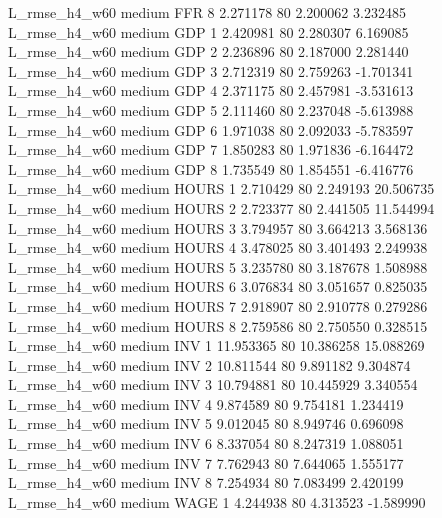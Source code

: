  L_rmse_h4_w60     medium      FFR                 8  2.271178 80       2.200062           3.232485
 L_rmse_h4_w60     medium      GDP                 1  2.420981 80       2.280307           6.169085
 L_rmse_h4_w60     medium      GDP                 2  2.236896 80       2.187000           2.281440
 L_rmse_h4_w60     medium      GDP                 3  2.712319 80       2.759263          -1.701341
 L_rmse_h4_w60     medium      GDP                 4  2.371175 80       2.457981          -3.531613
 L_rmse_h4_w60     medium      GDP                 5  2.111460 80       2.237048          -5.613988
 L_rmse_h4_w60     medium      GDP                 6  1.971038 80       2.092033          -5.783597
 L_rmse_h4_w60     medium      GDP                 7  1.850283 80       1.971836          -6.164472
 L_rmse_h4_w60     medium      GDP                 8  1.735549 80       1.854551          -6.416776
 L_rmse_h4_w60     medium    HOURS                 1  2.710429 80       2.249193          20.506735
 L_rmse_h4_w60     medium    HOURS                 2  2.723377 80       2.441505          11.544994
 L_rmse_h4_w60     medium    HOURS                 3  3.794957 80       3.664213           3.568136
 L_rmse_h4_w60     medium    HOURS                 4  3.478025 80       3.401493           2.249938
 L_rmse_h4_w60     medium    HOURS                 5  3.235780 80       3.187678           1.508988
 L_rmse_h4_w60     medium    HOURS                 6  3.076834 80       3.051657           0.825035
 L_rmse_h4_w60     medium    HOURS                 7  2.918907 80       2.910778           0.279286
 L_rmse_h4_w60     medium    HOURS                 8  2.759586 80       2.750550           0.328515
 L_rmse_h4_w60     medium      INV                 1 11.953365 80      10.386258          15.088269
 L_rmse_h4_w60     medium      INV                 2 10.811544 80       9.891182           9.304874
 L_rmse_h4_w60     medium      INV                 3 10.794881 80      10.445929           3.340554
 L_rmse_h4_w60     medium      INV                 4  9.874589 80       9.754181           1.234419
 L_rmse_h4_w60     medium      INV                 5  9.012045 80       8.949746           0.696098
 L_rmse_h4_w60     medium      INV                 6  8.337054 80       8.247319           1.088051
 L_rmse_h4_w60     medium      INV                 7  7.762943 80       7.644065           1.555177
 L_rmse_h4_w60     medium      INV                 8  7.254934 80       7.083499           2.420199
 L_rmse_h4_w60     medium     WAGE                 1  4.244938 80       4.313523          -1.589990
